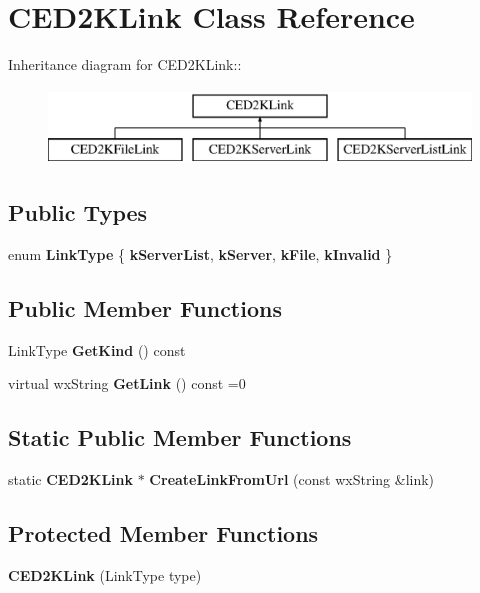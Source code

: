 \section{CED2KLink Class Reference}
\label{classCED2KLink}
Inheritance diagram for CED2KLink::\begin{figure}[H]
\begin{center}
\leavevmode
\includegraphics[height=2cm]{classCED2KLink}
\end{center}
\end{figure}
\subsection*{Public Types}
\begin{DoxyCompactItemize}
\item 
enum {\bfseries LinkType} \{ {\bfseries kServerList}, 
{\bfseries kServer}, 
{\bfseries kFile}, 
{\bfseries kInvalid}
 \}
\end{DoxyCompactItemize}
\subsection*{Public Member Functions}
\begin{DoxyCompactItemize}
\item 
LinkType {\bfseries GetKind} () const \label{classCED2KLink_a496ee4ec35ae9cd01627374b722e4e5f}

\item 
virtual wxString {\bfseries GetLink} () const =0\label{classCED2KLink_a1f6695503a4e1d9f62ddb7168488f0d8}

\end{DoxyCompactItemize}
\subsection*{Static Public Member Functions}
\begin{DoxyCompactItemize}
\item 
static {\bf CED2KLink} $\ast$ {\bfseries CreateLinkFromUrl} (const wxString \&link)\label{classCED2KLink_a44b27af5c81fd32d668d1baa58cbf62e}

\end{DoxyCompactItemize}
\subsection*{Protected Member Functions}
\begin{DoxyCompactItemize}
\item 
{\bfseries CED2KLink} (LinkType type)\label{classCED2KLink_aacdf2632f1a0717469054b018696f886}

\end{DoxyCompactItemize}
